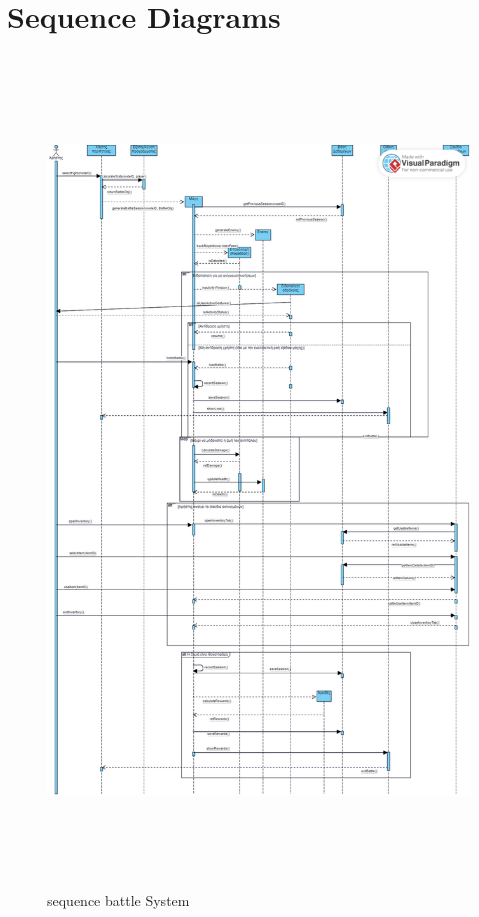 \section{Sequence Diagrams}
\begin{figure}[!htb]
  \centering
    \centering
    \includegraphics[width=18.5cm,height=22cm]{sequence_battle.png}
    \caption{sequence battle System}
    \label{}
\end{figure}
